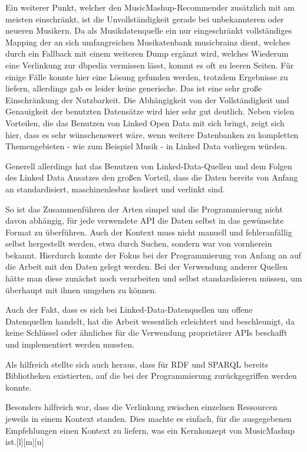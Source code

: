 Ein weiterer Punkt, welcher den MusicMashup-Recommender zusätzlich mit am meisten einschränkt, ist die Unvollständigkeit gerade bei unbekannteren oder neueren Musikern. Da als Musikdatenquelle ein nur eingeschränkt vollständiges Mapping der an sich umfangreichen Musikatenbank musicbrainz dient, welches durch ein Fallback mit einem weiteren Dump ergänzt wird, welches Wiederum eine Verlinkung zur dbpedia vermissen lässt, kommt es oft zu leeren Seiten. Für einige Fälle konnte hier eine Lösung gefunden werden, trotzdem Ergebnisse zu liefern, allerdings gab es leider keine generische.
Das ist eine sehr große Einschränkung der Nutzbarkeit. Die Abhängigkeit von der Vollständigkeit und Genauigkeit der benutzten Datensätze wird hier sehr gut deutlich. Neben vielen Vorteilen, die das Benutzen von Linked Open Data mit sich bringt, zeigt sich hier, dass es sehr wünschenswert wäre, wenn weitere Datenbanken zu kompletten Themengebieten - wie zum Beispiel Musik - in Linked Data vorliegen würden.


Generell allerdings hat das Benutzen von Linked-Data-Quellen und dem Folgen des Linked Data Ansatzes den großen Vorteil, dass die Daten bereits von Anfang an standardisiert, maschinenlesbar kodiert und verlinkt sind.


So ist das Zusammenführen der Arten simpel und die Programmierung nicht davon abhängig, für jede verwendete API die Daten selbst in das gewünschte Format zu überführen. Auch der Kontext muss nicht manuell und fehleranfällig selbst hergestellt werden, etwa durch Suchen, sondern war von vornherein bekannt. Hierdurch konnte der Fokus bei der Programmierung von Anfang an auf die Arbeit mit den Daten gelegt werden. Bei der Verwendung anderer Quellen hätte man diese zunächst noch verarbeiten und selbst standardisieren müssen, um überhaupt mit ihnen umgehen zu können.


Auch der Fakt, dass es sich bei Linked-Data-Datenquellen um  offene Datenquellen handelt, hat die Arbeit wesentlich erleichtert und beschleunigt, da keine Schlüssel oder ähnliches für die Verwendung proprietärer APIs beschafft und implementiert werden mussten. 


Als hilfreich stellte sich auch heraus, dass für RDF und SPARQL bereits Bibliotheken existierten, auf die bei der Programmierung zurückgegriffen werden konnte.


Besonders hilfreich war, dass die Verlinkung zwischen einzelnen Ressourcen jeweils in einem Kontext standen. Dies machte es einfach, für die ausgegebenen Empfehlungen einen Kontext zu liefern, was ein Kernkonzept von MusicMashup ist.[l][m][n]